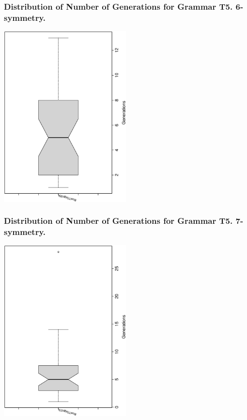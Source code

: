 \documentclass[18pt,c]{beamer}
\begin{document}
 \begin{frame}
 \frametitle{ Distribution of Number of Generations for Grammar T5. 6-symmetry. }
 \begin{center}
\includegraphics[width=0.5\textwidth, angle=-90]
{ExpFboxplottGenerations004.eps}
 \end{center}
 \label{ExpFboxplottGenerations004.eps}  
 \end{frame}

 \begin{frame}
 \frametitle{ Distribution of Number of Generations for Grammar T5. 7-symmetry. }
 \begin{center}
\includegraphics[width=0.5\textwidth, angle=-90]
{ExpFboxplottGenerations005.eps}
 \end{center}
 \label{ExpFboxplottGenerations005.eps}  
 \end{frame}
\end{document}
